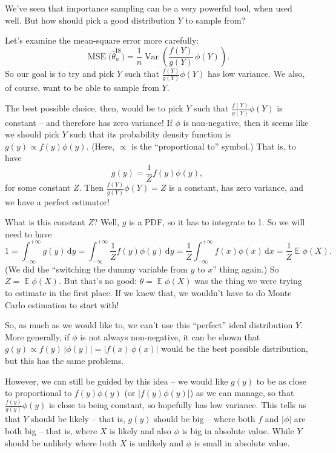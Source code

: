 \documentclass[
  letterpaper,
  DIV=11,
  numbers=noendperiod]{scrreprt}
\newcommand{\Exg}{\operatorname{\mathbb{E}}}
\theoremstyle{plain}
\theoremstyle{definition}
\theoremstyle{definition}
\theoremstyle{remark}
\begin{document}
We've seen that importance sampling can be a very powerful tool, when
used well. But how should pick a good distribution \(Y\) to sample from?

Let's examine the mean-square error more carefully:
\[ \operatorname{MSE}\big(\widehat{\theta}_n^{\mathrm{IS}}\big) = \frac{1}{n} \operatorname{Var}\left( \frac{f(Y)}{g(Y)}\,\phi(Y) \right) . \]
So our goal is to try and pick \(Y\) such that
\(\frac{f(Y)}{g(Y)}\phi(Y)\) has low variance. We also, of course, want
to be able to sample from \(Y\).

The best possible choice, then, would be to pick \(Y\) such that
\(\frac{f(Y)}{g(Y)}\phi(Y)\) is constant -- and therefore has zero
variance! If \(\phi\) is non-negative, then it seems like we should pick
\(Y\) such that its probability density function is
\(g(y) \propto f(y)\phi(y)\). (Here, \(\propto\) is the ``proportional
to'' symbol.) That is, to have \[ g(y) = \frac{1}{Z} f(y)\phi(y) , \]
for some constant \(Z\). Then \(\frac{f(Y)}{g(Y)}\phi(Y) = Z\) is a
constant, has zero variance, and we have a perfect estimator!

What is this constant \(Z\)? Well, \(g\) is a PDF, so it has to
integrate to 1. So we will need to have
\[ 1 = \int_{-\infty}^{+\infty} g(y)\, \mathrm{d}y = \int_{-\infty}^{+\infty} \frac{1}{Z} f(y)\phi(y) \, \mathrm{d}y = \frac{1}{Z} \int_{-\infty}^{+\infty} f(x)\phi(x) \, \mathrm{d}x = \frac{1}{Z} \Exg\phi(X) . \]
(We did the ``switching the dummy variable from \(y\) to \(x\)'' thing
again.) So \(Z = \Exg \phi(X)\). But that's no good:
\(\theta = \Exg \phi(X)\) was the thing we were trying to estimate in
the first place. If we knew that, we wouldn't have to do Monte Carlo
estimation to start with!

So, as much as we would like to, we can't use this ``perfect'' ideal
distribution \(Y\). More generally, if \(\phi\) is not always
non-negative, it can be shown that
\(g(y) \propto f(y)\,|\phi(y)| = |f(x)\,\phi(x)|\) would be the best
possible distribution, but this has the same problems.

However, we can still be guided by this idea -- we would like \(g(y)\)
to be as close to proportional to \(f(y) \phi(y)\) (or
\(|f(y) \phi(y)|\)) as we can manage, so that
\(\frac{f(y)}{g(y)}\phi(y)\) is close to being constant, so hopefully
has low variance. This tells us that \(Y\) should be likely -- that is,
\(g(y)\) should be big -- where both \(f\) and \(|\phi|\) are both big
-- that is, where \(X\) is likely and also \(\phi\) is big in absolute
value. While \(Y\) should be unlikely where both \(X\) is unlikely and
\(\phi\) is small in absolute value.
\end{document}
